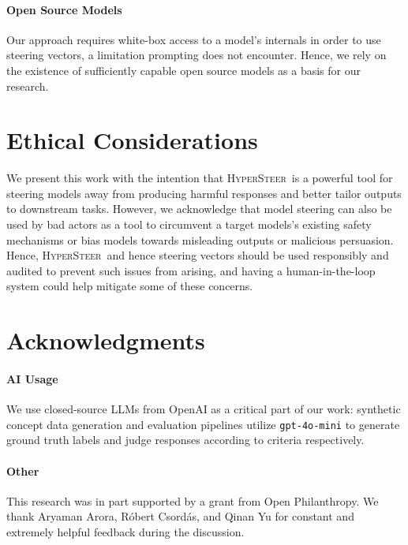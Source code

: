 \documentclass[11pt]{article}
\newcommand{\methodname}{\textsc{HyperSteer}}
\newcommand{\gpt}{\texttt{gpt-4o-mini}}
\begin{document}
\paragraph{Open Source Models} Our approach requires white-box access to a model's internals in order to use steering vectors, a limitation prompting does not encounter. Hence, we rely on the existence of sufficiently capable open source models as a basis for our research.


\section{Ethical Considerations}
We present this work with the intention that \methodname\ is a powerful tool for steering models away from producing harmful responses and better tailor outputs to downstream tasks. However, we acknowledge that model steering can also be used by bad actors as a tool to circumvent a target models's existing safety mechanisms or bias models towards misleading outputs or malicious persuasion. Hence, \methodname\ and hence steering vectors should be used responsibly and audited to prevent such issues from arising, and having a human-in-the-loop system could help mitigate some of these concerns.

\section{Acknowledgments}

\paragraph{AI Usage}
We use closed-source LLMs from OpenAI as a critical part of our work: synthetic concept data generation and evaluation pipelines utilize \gpt\; to generate ground truth labels and judge responses according to criteria respectively.
\paragraph{Other} This research was in part supported by a grant from Open Philanthropy. We thank Aryaman Arora, Róbert Csordás, and Qinan Yu for constant and extremely helpful feedback during the discussion. 
\end{document}
